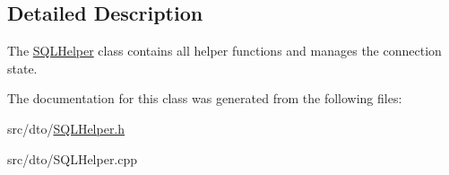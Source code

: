 \subsection{Detailed Description}
The \mbox{\hyperlink{classdto_1_1_s_q_l_helper}{S\+Q\+L\+Helper}} class contains all helper functions and manages the connection state. 

The documentation for this class was generated from the following files\+:\begin{DoxyCompactItemize}
\item 
src/dto/\mbox{\hyperlink{_s_q_l_helper_8h}{S\+Q\+L\+Helper.\+h}}\item 
src/dto/S\+Q\+L\+Helper.\+cpp\end{DoxyCompactItemize}
